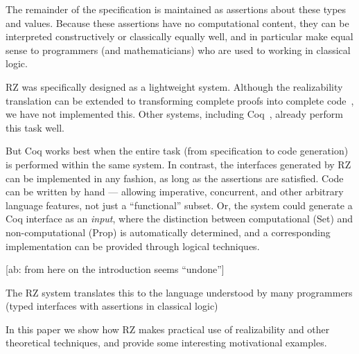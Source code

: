 The remainder of the specification is maintained as assertions about
these types and values. Because these assertions have no computational
content, they can be interpreted constructively or classically equally
well, and in particular make equal sense to programmers (and
mathematicians) who are used to working in classical logic.

\bigskip

RZ was specifically designed as a lightweight system. Although the
realizability translation can be extended to transforming complete
proofs into complete code~\cite{komagata+:tr95}, we have not
implemented this. Other systems, including Coq~\cite{coq}, already
perform this task well.

But Coq works best when the entire task (from specification to code
generation) is performed within the same system. In contrast, the
interfaces generated by RZ can be implemented in any fashion, as long
as the assertions are satisfied. Code can be written by hand ---
allowing imperative, concurrent, and other arbitrary language
features, not just a ``functional'' subset. Or, the system could
generate a Coq interface as an \emph{input}, where the distinction
between computational (Set) and non-computational (Prop) is
automatically determined, and a corresponding implementation can be
provided through logical techniques.

[ab: from here on the introduction seems ``undone'']

The RZ system translates this to the language understood by many
programmers (typed interfaces with assertions in classical logic)

\bigskip

In this paper we show how RZ makes practical use of realizability and
other theoretical techniques, and provide some interesting motivational
examples.



